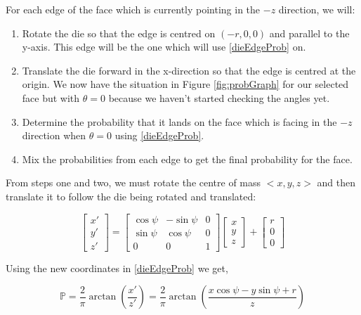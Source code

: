 \documentclass[english,12pt,a4paper,final]{article}
\begin{document}
For each edge of the face which is currently pointing in the $-z$ direction, we will:

\begin{enumerate}
	\item Rotate the die so that the edge is centred on $(-r, 0, 0)$ and parallel to the y-axis. This edge will be the one which will use \eqref{dieEdgeProb} on.
	\item Translate the die forward in the x-direction so that the edge is centred at the origin. We now have the situation in Figure \ref{fig:probGraph} for our selected face but with $\theta=0$ because we haven't started checking the angles yet.
	\item Determine the probability that it lands on the face which is facing in the $-z$ direction when $\theta=0$ using \eqref{dieEdgeProb}.
	\item Mix the probabilities from each edge to get the final probability for the face.
\end{enumerate}

From steps one and two, we must rotate the centre of mass $<x, y, z>$ and then translate it to follow the die being rotated and translated:

\begin{equation*}
	\begin{bmatrix}x'\\y'\\z'\end{bmatrix} = \begin{bmatrix}\cos\psi & -\sin\psi & 0 \\ \sin\psi & \cos\psi & 0 \\ 0 & 0 & 1\end{bmatrix} \begin{bmatrix}x\\y\\z\end{bmatrix} + \begin{bmatrix}r\\0\\0\end{bmatrix}
\end{equation*}

Using the new coordinates in \eqref{dieEdgeProb} we get,

\begin{equation*}
	\mathbb{P} = \frac{2}{\pi}\arctan\left(\frac{x'}{z'}\right) = \frac{2}{\pi}\arctan\left(\frac{x\cos\psi-y\sin\psi+r}{z}\right)
\end{equation*}
\end{document}
